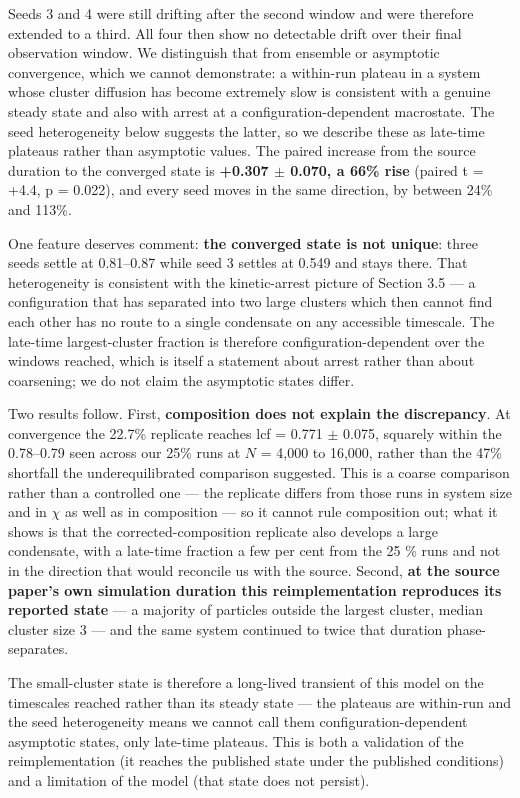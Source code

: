 \documentclass[aps,pre,preprint,superscriptaddress,nofootinbib,longbibliography]{revtex4-2}
\begin{document}
Seeds 3 and 4 were still drifting after the second window and were therefore extended to a third. All four then show no detectable drift over their final observation window. We distinguish that from ensemble or asymptotic convergence, which we cannot demonstrate: a within-run plateau in a system whose cluster diffusion has become extremely slow is consistent with a genuine steady state and also with arrest at a configuration-dependent macrostate. The seed heterogeneity below suggests the latter, so we describe these as late-time plateaus rather than asymptotic values. The paired increase from the source duration to the converged state is \textbf{+0.307 $\pm$ 0.070, a 66\% rise} (paired t = +4.4, p = 0.022), and every seed moves in the same direction, by between 24\% and 113\%.

One feature deserves comment: \textbf{the converged state is not unique}: three seeds settle at 0.81--0.87 while seed 3 settles at 0.549 and stays there. That heterogeneity is consistent with the kinetic-arrest picture of Section 3.5 --- a configuration that has separated into two large clusters which then cannot find each other has no route to a single condensate on any accessible timescale. The late-time largest-cluster fraction is therefore configuration-dependent over the windows reached, which is itself a statement about arrest rather than about coarsening; we do not claim the asymptotic states differ.

Two results follow. First, \textbf{composition does not explain the discrepancy}. At convergence the 22.7\% replicate reaches lcf = 0.771 $\pm$ 0.075, squarely within the 0.78--0.79 seen across our 25\% runs at $N$ = 4,000 to 16,000, rather than the 47\% shortfall the underequilibrated comparison suggested. This is a coarse comparison rather than a controlled one --- the replicate differs from those runs in system size and in $\chi$ as well as in composition --- so it cannot rule composition out; what it shows is that the corrected-composition replicate also develops a large condensate, with a late-time fraction a few per cent from the 25 \% runs and not in the direction that would reconcile us with the source. Second, \textbf{at the source paper's own simulation duration this reimplementation reproduces its reported state} --- a majority of particles outside the largest cluster, median cluster size 3 --- and the same system continued to twice that duration phase-separates.

The small-cluster state is therefore a long-lived transient of this model on the timescales reached rather than its steady state --- the plateaus are within-run and the seed heterogeneity means we cannot call them configuration-dependent asymptotic states, only late-time plateaus. This is both a validation of the reimplementation (it reaches the published state under the published conditions) and a limitation of the model (that state does not persist).
\end{document}
